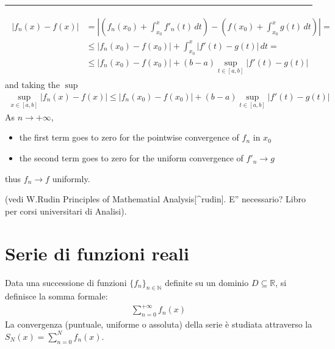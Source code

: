 \documentclass[letterpaper,10pt,italian]{jupyterBook}
\begin{document}
\bigskip\hrule\bigskip

\begin{equation*}
\begin{split}\begin{aligned}
  \left| f_n(x) - f(x) \right|
  & = \left| \left( f_n(x_0) + \int_{x_0}^{x} f'_n(t) \, dt \right) - \left( f(x_0) + \int_{x_0}^{x} g(t) \, dt \right) \right| = \\
  & \le \left| f_n(x_0) - f(x_0) \right| + \int_{x_0}^{x}  \left| f'(t) - g(t) \right| \, dt = \\
  & \le \left| f_n(x_0) - f(x_0) \right| + ( b - a ) \sup_{t \in [a,b]}\left| f'(t) - g(t) \right|
\end{aligned}\end{split}
\end{equation*}
\sphinxAtStartPar
and taking the \(\sup\)
\begin{equation*}
\begin{split}
\sup_{x \in [a,b]} \left| f_n(x) - f(x) \right| \le \left| f_n(x_0) - f(x_0) \right| + ( b - a ) \sup_{t \in [a,b]}\left| f'(t) - g(t) \right|
\end{split}
\end{equation*}
\sphinxAtStartPar
As \(n \rightarrow +\infty\),
\begin{itemize}
\item {} 
\sphinxAtStartPar
the first term goes to zero for the pointwise convergence of \(f_n\) in \(x_0\)

\item {} 
\sphinxAtStartPar
the second term goes to zero for the uniform convergence of \(f'_n \rightarrow g\)

\end{itemize}

\sphinxAtStartPar
thus \(f_n \rightarrow f\) uniformly.

\sphinxAtStartPar
(vedi W.Rudin Principles of Mathematial Analysis{[}\textasciicircum{}rudin{]}. E” necessario? Libro per corsi universitari di Analisi). 




\section{Serie di funzioni reali}
\label{\detokenize{ch/series/series-functions-real:serie-di-funzioni-reali}}\label{\detokenize{ch/series/series-functions-real:math-hs-series-fun-series}}
\sphinxAtStartPar
Data una successione di funzioni \(\{f_n\}_{n \in \mathbb{N}}\) definite su un dominio \(D \subseteq \mathbb{R}\), si definisce  la somma formale:
\begin{equation*}
\begin{split}\sum_{n=0}^{+\infty} f_n(x)\end{split}
\end{equation*}
\sphinxAtStartPar
La convergenza (puntuale, uniforme o assoluta) della serie è studiata attraverso la  \(S_N(x) = \sum_{n=0}^{N} f_n(x)\).
\end{document}
